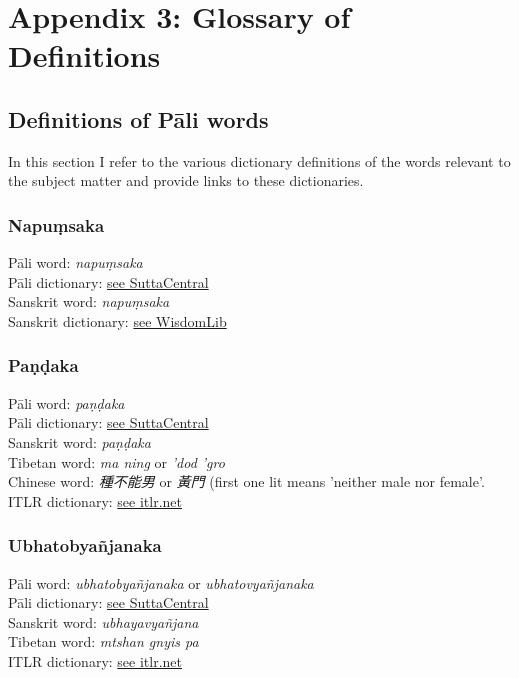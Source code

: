 \section{Appendix 3: Glossary of Definitions}
\label{appendix3}

\subsection{Definitions of Pāli words}
In this section I refer to the various dictionary definitions of the words relevant to the subject matter and provide links to these dictionaries.

\subsubsection{Napuṃsaka}
Pāli word: {\em napuṃsaka} \\
Pāli dictionary: \href{https://suttacentral.net/define/napu%E1%B9%83saka}{see SuttaCentral} \\
Sanskrit word: {\em napuṃsaka} \\
Sanskrit dictionary: \href{https://www.wisdomlib.org/definition/napumsaka}{see WisdomLib} \\

\subsubsection{Paṇḍaka}
Pāli word: {\em paṇḍaka} \\
Pāli dictionary: \href{https://suttacentral.net/define/pa%E1%B9%87%E1%B8%8Daka}{see SuttaCentral} \\
Sanskrit word: {\em paṇḍaka} \\
Tibetan word: {\em ma ning} or {\em ’dod ’gro} \\
Chinese word: {\em 種不能男} or {\em 黃門} (first one lit means 'neither male nor female'.\\
ITLR dictionary: \href{http://www.itlr.net/hwid:281142}{see itlr.net} \\

\subsubsection{Ubhatob­yañ­janaka}
Pāli word: {\em ubhatob­yañ­janaka} or {\em ubhatovyañ­janaka} \\
Pāli dictionary: \href{https://suttacentral.net/define/ubhatovya%C3%B1janaka}{see SuttaCentral} \\
Sanskrit word: {\em ubhayavyañjana} \\
Tibetan word: {\em mtshan gnyis pa} \\
ITLR dictionary: \href{http://www.itlr.net/hwid:62844}{see itlr.net} \\

